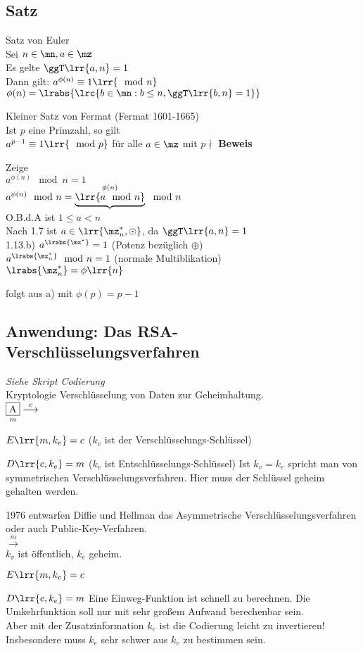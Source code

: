 \subsection{Satz}
		\item Satz von Euler\\
			Sei $n\in\mn, a\in\mz$\\
			Es gelte $\ggT\lrr{a,n}=1$\\
			Dann gilt: $a^{\phi(n)}\equiv 1\lrr{\mod n}$\\
			$\phi(n)=\lrabs{\lrc{b\in\mn: b\leq n, \ggT\lrr{b,n}=1}}$
		\item Kleiner Satz von Fermat (Fermat 1601-1665)\\
			Ist $p$ eine Primzahl, so gilt\\
			$a^{p-1}\equiv 1\lrr{\mod p}$ für alle $a\in\mz$ mit $p\nmid$
	\subExEnd
	\textbf{Beweis}
		\item Zeige\\
			$a^{\phi(n)}\mod n = 1$\\
			$a^{\phi(n)}\mod n = \underbrace{\lrr{a\mod n}}^{\phi(n)}\mod n$\\
			O.B.d.A ist $1\leq a < n$\\
			Nach 1.7 ist $a\in\lrr{\mz_n^*,\odot}$, da $\ggT\lrr{a,n}=1$\\
			1.13.b) $a^{\lrabs{\mz^*}}=1$ (Potenz bezüglich $\oplus$)\\
			$a^{\lrabs{\mz_n^*}}\mod n = 1$ (normale Multiblikation)\\
			$\lrabs{\mz_n^*}=\phi\lrr{n}$
		\item folgt aus a) mit $\phi(p) = p-1$
	\subExEnd
\subsection{Anwendung: Das RSA-Verschlüsselungsverfahren}
	\textit{Siehe Skript Codierung} \\
	Kryptologie Verschlüsselung von Daten zur Geheimhaltung.\\
	$\underset{m}{\mbox{\fbox{A}}}\overset{c}{\longrightarrow}$
		\item $E\lrr{m,k_v}=c$ ($k_v$ ist der Verschlüsselungs-Schlüssel)
		\item $D\lrr{c,k_e}=m$ ($k_e$ ist Entschlüsselungs-Schlüssel)
	\subExEnd
	Ist $k_v = k_e$ spricht man von symmetrischen Verschlüsselungsverfahren. Hier muss der Schlüssel geheim gehalten werden.
	
	1976 entwarfen Diffie und Hellman das Asymmetrische Verschlüsselungsverfahren oder auch Public-Key-Verfahren.\\
	$\overset{m}{\longrightarrow}$ \\
	$k_v$ ist öffentlich, $k_e$ geheim.
		\item $E\lrr{m,k_v}=c$
		\item $D\lrr{c,k_e}=m$
	\subExEnd
	Eine Einweg-Funktion ist schnell zu berechnen. Die Umkehrfunktion soll nur mit sehr großem Aufwand berechenbar sein.\\
	Aber mit der Zusatzinformation $k_e$ ist die Codierung leicht zu invertieren!\\
	Insbesondere muss $k_e$ sehr schwer aus $k_v$ zu bestimmen sein.
	
